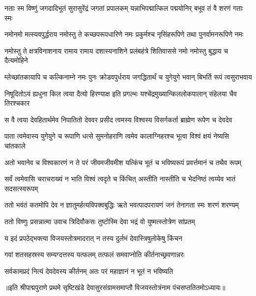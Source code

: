 

\fourlineindentedshloka
{नताः स्म विष्णुं जगदादिभूतं}
{सुरासुरेंद्रं जगतां प्रपालकम्}
{यन्नाभिपद्मात्किल पद्मयोनिर्}
{बभूव तं वै शरणं गताः स्मः} %

\fourlineindentedshloka
{नमोनमो मत्स्यवपुर्द्धराय}
{नमोस्तु ते कच्छपरूपधारिणे}
{नमः प्रकुर्मश्च नृसिंहरूपिणे}
{तथा पुनर्वामनरूपिणे नमः} %

\fourlineindentedshloka
{नमोस्तु ते क्षत्रविनाशनाय}
{रामाय रामाय दशास्यनाशिने}
{प्रलंबहंत्रे शितिवाससे नमो}
{नमोस्तु बुद्धाय च दैत्यमोहिने} %

\fourlineindentedshloka
{म्लेच्छांतकायापि च कल्किनाम्ने}
{नमः पुनः क्रोडवपुर्धराय}
{जगद्धितार्थं च युगेयुगे भवान्}
{बिभर्ति रूपं त्वसुराभवाय} %

\fourlineindentedshloka
{निषूदितोऽयं ह्यधुना किल त्वया}
{दैत्यो हिरण्याक्ष इति प्रगल्भः}
{यश्चेंद्रमुख्यान्किललोकपालान्}
{संहेलया चैव तिरश्चकार} %

\fourlineindentedshloka
{स वै त्वया देवहितार्थमेव}
{निपातितो देववर प्रसीद}
{त्वमस्य विश्वस्य विसर्गकर्ता}
{ब्राह्मेण रूपेण च देवदेव} %

\fourlineindentedshloka
{पाता त्वमेवास्य युगेयुगे च}
{रूपाणि धत्से सुमनोहराणि}
{त्वमेव कालाग्निहरश्च भूत्वा}
{विश्वं क्षयं नेष्यसि चांतकाले} %

\fourlineindentedshloka
{अतो भवानेव च विश्वकारणं}
{न ते परं जीवमजीवमीश}
{यत्किंच भूतं च भविष्यरूपं}
{प्रवर्त्तमानं च तथैव रूपम्} %

\fourlineindentedshloka
{सर्वं त्वमेवासि चराचराख्यं}
{न भाति विश्वं त्वदृते च किंचित्}
{अस्तीति नास्तीति च भेदनिष्ठं}
{त्वय्येव भातं सदसत्स्वरूपम्} %

\fourlineindentedshloka
{ततो भवंतं कतमोपि देव}
{न ज्ञातुमर्हत्यविपक्वबुद्धिः}
{ऋते भवत्पादपरायणं जनं}
{तेनागता स्मः शरणं शरण्यम्} %


\twolineshloka
{ततो विष्णुः प्रसन्नात्मा उवाच त्रिदिवौकसः}
{तुष्टोस्मि देवा भद्रं वो युष्मत्स्तोत्रेण सांप्रतम्} %

\twolineshloka
{य इदं प्रपठेद्भक्त्या विजयस्तोत्रमादरात्}
{न तस्य दुर्लभं देवास्त्रिषुलोकेषु किंचन} %

\twolineshloka
{गवां शतसहस्रस्य सम्यग्दत्तस्य यत्फलम्}
{तत्फलं समवाप्नोति कीर्तनाच्छ्रवणान्नरः} %

\twolineshloka
{सर्वकामप्रदं नित्यं देवदेवस्य कीर्तनम्}
{अतः परं महाज्ञानं न भूतं न भविष्यति} %

॥इति श्रीपाद्मपुराणे प्रथमे सृष्टिखंडे देवासुरसंग्रामसमाप्तौ विजयस्तोत्रंनाम पंचसप्ततितमोऽध्यायः॥ %